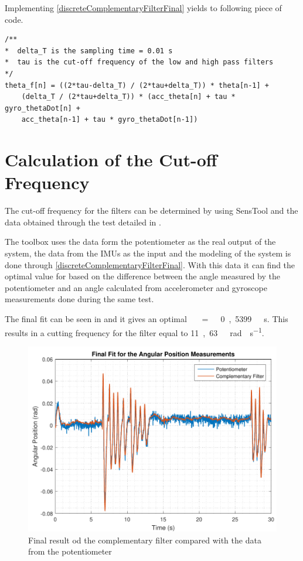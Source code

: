 %
Implementing \eqref{discreteComplementaryFilterFinal} yields to following piece of code. 
%
\begin{lstlisting}[caption  = {Code for the implementation of the complementary filter in C++},
label    = codeCompFilter ]
/**
*  delta_T is the sampling time = 0.01 s
*  tau is the cut-off frequency of the low and high pass filters
*/
theta_f[n] = ((2*tau-delta_T) / (2*tau+delta_T)) * theta[n-1] + 
	(delta_T / (2*tau+delta_T)) * (acc_theta[n] + tau * gyro_thetaDot[n] + 
	acc_theta[n-1] + tau * gyro_thetaDot[n-1]) 
\end{lstlisting}

\section{Calculation of the Cut-off Frequency}
The cut-off frequency for the filters can be determined by using SensTool and the data obtained through the test detailed in . 

The toolbox uses the data form the potentiometer as the real output of the system, the data from the IMUs as the input and the modeling of the system is done through \eqref{discreteComplementaryFilterFinal}. With this data it can find the optimal value for \si{\tau} based on the difference between the angle measured by the potentiometer and an angle calculated from accelerometer and gyroscope measurements done during the same test.

The final fit can be seen in  and it gives an optimal \si{\tau\ =\ 0,5399\ s}. This results in a cutting frequency for the filter equal to \si{11,63\ rad \cdot s^{-1}}.
%
\begin{figure}[H]
	\centering
	\includegraphics[scale=0.65]{figures/filterSensTool}
	\caption{Final result od the complementary filter compared with the data from the potentiometer}
	\label{filterSensTool}
\end{figure}\vspace{-5mm}
%